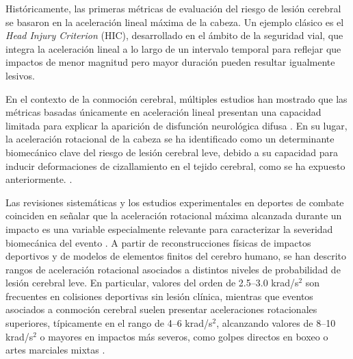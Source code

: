 Históricamente, las primeras métricas de evaluación del riesgo de lesión cerebral se basaron en la aceleración lineal máxima de la cabeza. Un ejemplo clásico es el \textit{Head Injury Criterion} (HIC), desarrollado en el ámbito de la seguridad vial, que integra la aceleración lineal a lo largo de un intervalo temporal para reflejar que impactos de menor magnitud pero mayor duración pueden resultar igualmente lesivos. 

En el contexto de la conmoción cerebral, múltiples estudios han mostrado que las métricas basadas únicamente en aceleración lineal presentan una capacidad limitada para explicar la aparición de disfunción neurológica difusa \cite{Meaney2011Biomechanics,Guskiewicz2011}. En su lugar, la aceleración rotacional de la cabeza se ha identificado como un determinante biomecánico clave del riesgo de lesión cerebral leve, debido a su capacidad para inducir deformaciones de cizallamiento en el tejido cerebral, como se ha expuesto anteriormente. \cite{Meaney2011Biomechanics,Lota2022}.

Las revisiones sistemáticas y los estudios experimentales en deportes de combate coinciden en señalar que la aceleración rotacional máxima alcanzada durante un impacto es una variable especialmente relevante para caracterizar la severidad biomecánica del evento \cite{Lota2022,Tierney2024}. A partir de reconstrucciones físicas de impactos deportivos y de modelos de elementos finitos del cerebro humano, se han descrito rangos de aceleración rotacional asociados a distintos niveles de probabilidad de lesión cerebral leve. En particular, valores del orden de 2.5–3.0 krad/s$^2$ son frecuentes en colisiones deportivas sin lesión clínica, mientras que eventos asociados a conmoción cerebral suelen presentar aceleraciones rotacionales superiores, típicamente en el rango de 4–6 krad/s$^2$, alcanzando valores de 8–10 krad/s$^2$ o mayores en impactos más severos, como golpes directos en boxeo o artes marciales mixtas \cite{Hoshizaki2017,Lota2022}.

